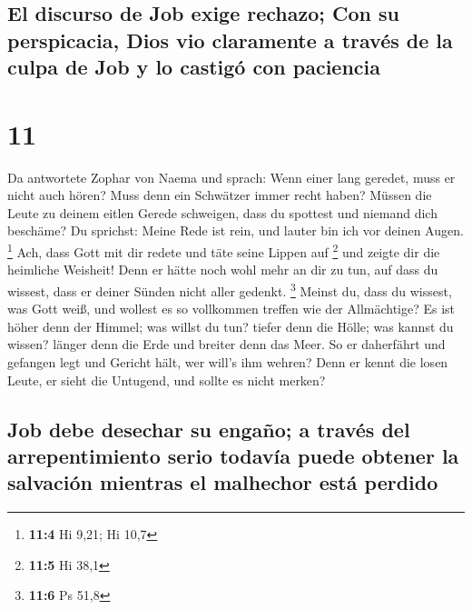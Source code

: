 \hypertarget{el-discurso-de-job-exige-rechazo-con-su-perspicacia-dios-vio-claramente-a-travuxe9s-de-la-culpa-de-job-y-lo-castiguxf3-con-paciencia}{%
\subsection{El discurso de Job exige rechazo; Con su perspicacia, Dios
vio claramente a través de la culpa de Job y lo castigó con
paciencia}\label{el-discurso-de-job-exige-rechazo-con-su-perspicacia-dios-vio-claramente-a-travuxe9s-de-la-culpa-de-job-y-lo-castiguxf3-con-paciencia}}

\hypertarget{section-10}{%
\section{11}\label{section-10}}

 Da antwortete Zophar von Naema und sprach: 
Wenn einer lang geredet, muss er nicht auch hören? Muss denn ein
Schwätzer immer recht haben?  Müssen die Leute zu deinem
eitlen Gerede schweigen, dass du spottest und niemand dich beschäme?
 Du sprichst: Meine Rede ist rein, und lauter bin ich vor
deinen Augen. \footnote{\textbf{11:4} Hi 9,21; Hi 10,7} 
Ach, dass Gott mit dir redete und täte seine Lippen auf \footnote{\textbf{11:5}
  Hi 38,1}  und zeigte dir die heimliche Weisheit! Denn er
hätte noch wohl mehr an dir zu tun, auf dass du wissest, dass er deiner
Sünden nicht aller gedenkt. \footnote{\textbf{11:6} Ps 51,8}
 Meinst du, dass du wissest, was Gott weiß, und wollest es
so vollkommen treffen wie der Allmächtige?  Es ist höher
denn der Himmel; was willst du tun? tiefer denn die Hölle; was kannst du
wissen?  länger denn die Erde und breiter denn das Meer.
 So er daherfährt und gefangen legt und Gericht hält, wer
will's ihm wehren?  Denn er kennt die losen Leute, er
sieht die Untugend, und sollte es nicht merken?

\hypertarget{job-debe-desechar-su-engauxf1o-a-travuxe9s-del-arrepentimiento-serio-todavuxeda-puede-obtener-la-salvaciuxf3n-mientras-el-malhechor-estuxe1-perdido}{%
\subsection{Job debe desechar su engaño; a través del arrepentimiento
serio todavía puede obtener la salvación mientras el malhechor está
perdido}\label{job-debe-desechar-su-engauxf1o-a-travuxe9s-del-arrepentimiento-serio-todavuxeda-puede-obtener-la-salvaciuxf3n-mientras-el-malhechor-estuxe1-perdido}}

